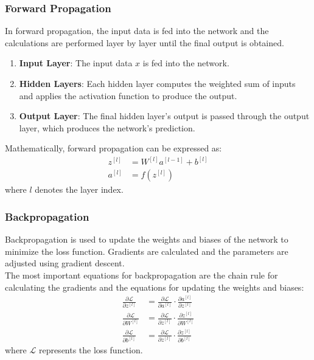 \documentclass{article}
\begin{document}
\subsubsection{Forward Propagation}
In forward propagation, the input data is fed into the network and the calculations are performed layer by layer until the final output is obtained.
\begin{enumerate}
    \item \textbf{Input Layer}: The input data \( x \) is fed into the network.
    \item \textbf{Hidden Layers}: Each hidden layer computes the weighted sum of inputs and applies the activation function to produce the output.
    \item \textbf{Output Layer}: The final hidden layer's output is passed through the output layer, which produces the network's prediction.
\end{enumerate}
Mathematically, forward propagation can be expressed as:
\begin{align*}
    z^{[l]} & = W^{[l]}a^{[l-1]} + b^{[l]} \\
    a^{[l]} & = f(z^{[l]})
\end{align*}
where \( l \) denotes the layer index.
\subsubsection{Backpropagation}

Backpropagation is used to update the weights and biases of the network to minimize the loss function. Gradients are calculated and the parameters are adjusted using gradient descent.\\
The most important equations for backpropagation are the chain rule for calculating the gradients and the equations for updating the weights and biases:
\begin{align*}
    \frac{\partial \mathcal{L}}{\partial z^{[l]}} & = \frac{\partial \mathcal{L}}{\partial a^{[l]}} \cdot \frac{\partial a^{[l]}}{\partial z^{[l]}} \\
    \frac{\partial \mathcal{L}}{\partial W^{[l]}} & = \frac{\partial \mathcal{L}}{\partial z^{[l]}} \cdot \frac{\partial z^{[l]}}{\partial W^{[l]}} \\
    \frac{\partial \mathcal{L}}{\partial b^{[l]}} & = \frac{\partial \mathcal{L}}{\partial z^{[l]}} \cdot \frac{\partial z^{[l]}}{\partial b^{[l]}}
\end{align*}
where \( \mathcal{L} \) represents the loss function.
\end{document}
